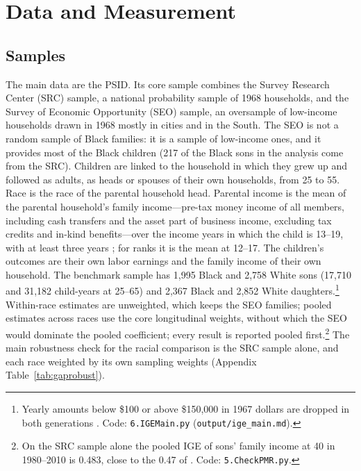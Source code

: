 \section{Data and Measurement}\label{sec:data}

\subsection{Samples}

The main data are the PSID. Its core sample combines the Survey Research Center (SRC) sample, a national
probability sample of 1968 households, and the Survey of Economic Opportunity (SEO) sample, an oversample of low-income
households drawn in 1968 mostly in cities and in the South. The SEO is not a random sample of Black families: it is a
sample of low-income ones, and it provides most of the Black children (217 of the Black sons in the analysis come from
the SRC). Children are linked to the household in which they grew up and followed as adults, as heads or spouses of
their own households, from 25 to 55. Race is the race of the parental household head. Parental income is the mean of
the parental household's family income---pre-tax money income of all members, including cash transfers and the asset
part of business income, excluding tax credits and in-kind benefits---over the income years in which the child is 13--19, with at least three years
\citep[as in][]{lee2009trends, palomino2018one}; for ranks it is the mean at 12--17. The children's outcomes are their
own labor earnings and the family income of their own household. The benchmark sample has 1,995 Black and 2,758 White
sons (17,710 and 31,182 child-years at 25--65) and 2,367 Black and 2,852 White daughters.\footnote{Yearly amounts below
\$100 or above \$150,000 in 1967 dollars are dropped in both generations \citep{palomino2018one}. Code:
\texttt{6.IGEMain.py} (\texttt{output/ige\_main.md}).} Within-race estimates are unweighted, which keeps the SEO
families; pooled estimates across races use the core longitudinal weights, without which the SEO would dominate the
pooled coefficient; every result is reported pooled first.\footnote{On the SRC sample alone the pooled IGE of sons'
family income at 40 in 1980--2010 is 0.483, close to the 0.47 of \citet{palomino2018one}. Code: \texttt{5.CheckPMR.py}.}
The main robustness check for the racial comparison is the SRC sample alone, and each race weighted by its own sampling
weights (Appendix Table~\ref{tab:gaprobust}).

